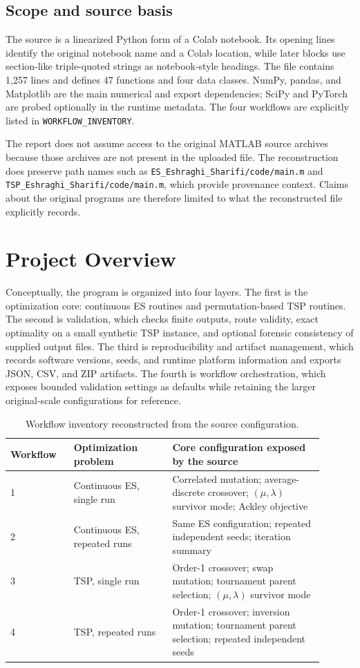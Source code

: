 \documentclass[11pt,a4paper]{article}
\newcommand{\code}[1]{\texttt{#1}}
\begin{document}
\subsection{Scope and source basis}
The source is a linearized Python form of a Colab notebook. Its opening lines identify the original notebook name and a Colab location, while later blocks use section-like triple-quoted strings as notebook-style headings. The file contains 1,257 lines and defines 47 functions and four data classes. NumPy, pandas, and Matplotlib are the main numerical and export dependencies; SciPy and PyTorch are probed optionally in the runtime metadata. The four workflows are explicitly listed in \code{WORKFLOW\_INVENTORY}.

The report does not assume access to the original MATLAB source archives because those archives are not present in the uploaded file. The reconstruction does preserve path names such as \code{ES\_Eshraghi\_Sharifi/code/main.m} and \code{TSP\_Eshraghi\_Sharifi/code/main.m}, which provide provenance context. Claims about the original programs are therefore limited to what the reconstructed file explicitly records.

\section{Project Overview}
Conceptually, the program is organized into four layers. The first is the optimization core: continuous ES routines and permutation-based TSP routines. The second is validation, which checks finite outputs, route validity, exact optimality on a small synthetic TSP instance, and optional forensic consistency of supplied output files. The third is reproducibility and artifact management, which records software versions, seeds, and runtime platform information and exports JSON, CSV, and ZIP artifacts. The fourth is workflow orchestration, which exposes bounded validation settings as defaults while retaining the larger original-scale configurations for reference.

\begin{table}[h]
\centering
\small
\begin{tabular}{@{}p{0.18\linewidth}p{0.29\linewidth}p{0.43\linewidth}@{}}
\toprule
Workflow & Optimization problem & Core configuration exposed by the source \\
\midrule
1 & Continuous ES, single run & Correlated mutation; average-discrete crossover; $(\mu,\lambda)$ survivor mode; Ackley objective \\
2 & Continuous ES, repeated runs & Same ES configuration; repeated independent seeds; iteration summary \\
3 & TSP, single run & Order-1 crossover; swap mutation; tournament parent selection; $(\mu,\lambda)$ survivor mode \\
4 & TSP, repeated runs & Order-1 crossover; inversion mutation; tournament parent selection; repeated independent seeds \\
\bottomrule
\end{tabular}
\caption{Workflow inventory reconstructed from the source configuration.}
\end{table}
\end{document}
